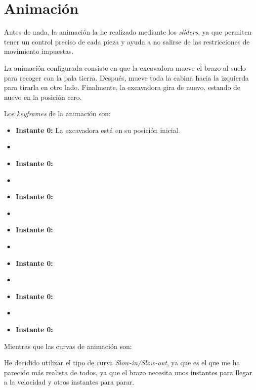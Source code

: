 \section{Animación}

Antes de nada, la animación la he realizado mediante los \textit{sliders}, ya que permiten tener un control preciso de cada pieza y ayuda a no salirse de las restricciones de movimiento impuestas.

\bigskip

La animación configurada consiste en que la excavadora mueve el brazo al suelo para recoger con la pala tierra. Después, mueve toda la cabina hacia la izquierda para tirarla en otro lado. Finalmente, la excavadora gira de nuevo, estando de nuevo en la posición cero.

\bigskip

Los \textit{keyframes} de la animación son:

\begin{itemize}
    \item \textbf{Instante 0: }La excavadora está en su posición inicial.
    \item \item \textbf{Instante 0: }
    \item \item \textbf{Instante 0: }
    \item \item \textbf{Instante 0: }
    \item \item \textbf{Instante 0: }
    \item \item \textbf{Instante 0: }
    \item \item \textbf{Instante 0: }
\end{itemize}



Mientras que las curvas de animación son: 


He decidido utilizar el tipo de curva \textit{Slow-in/Slow-out}, ya que es el que me ha parecido más realista de todos, ya que el brazo necesita unos instantes para llegar a la velocidad y otros instantes para parar.